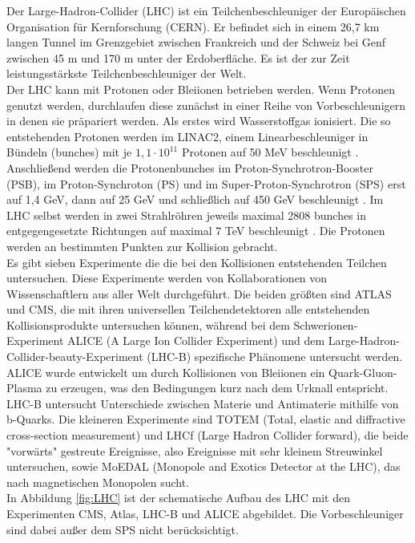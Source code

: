 Der Large-Hadron-Collider (LHC) ist ein Teilchenbeschleuniger der Europ\"aischen Organisation f\"ur Kernforschung (CERN). Er befindet sich in einem 26,7 km langen Tunnel im Grenzgebiet zwischen Frankreich und der Schweiz bei Genf zwischen 45 m und 170 m unter der Erdoberfl\"ache. Es ist der zur Zeit leistungsst\"arkste Teilchenbeschleuniger der Welt.\\
Der LHC kann mit Protonen oder Bleiionen betrieben werden. Wenn Protonen genutzt werden, durchlaufen diese zun\"achst in einer Reihe von Vorbeschleunigern in denen sie pr\"apariert werden. Als erstes wird Wasserstoffgas ionisiert. Die so entstehenden Protonen werden im LINAC2, einem Linearbeschleuniger in B\"undeln (bunches) mit je $1,1\cdot 10^{11}$ Protonen auf 50 MeV beschleunigt \cite{O'Luanaigh:1997427}. Anschlie\ss end werden die Protonenbunches im Proton-Synchrotron-Booster (PSB), im Proton-Synchroton (PS) und im Super-Proton-Synchrotron (SPS) erst auf 1,4 GeV, dann auf 25 GeV und schlie\ss lich auf 450 GeV beschleunigt \cite{O'Luanaigh:1997193}. Im LHC selbst werden in zwei Strahlr\"ohren jeweils maximal 2808 bunches in entgegengesetzte Richtungen auf maximal 7 TeV beschleunigt \cite{Lefevre:1165534}. Die Protonen werden an bestimmten Punkten zur Kollision gebracht. \\
Es gibt sieben Experimente die die bei den Kollisionen entstehenden Teilchen untersuchen. Diese Experimente werden von Kollaborationen von Wissenschaftlern aus aller Welt durchgef\"uhrt. Die beiden gr\"o\ss ten sind ATLAS und CMS, die mit ihren universellen Teilchendetektoren alle entstehenden Kollisionsprodukte untersuchen k\"onnen, w\"ahrend bei dem Schwerionen-Experiment ALICE (A Large Ion Collider Experiment) und dem Large-Hadron-Collider-beauty-Experiment (LHC-B) spezifische Ph\"anomene untersucht werden. ALICE wurde entwickelt um durch Kollisionen von Bleiionen ein Quark-Gluon-Plasma zu erzeugen, was den Bedingungen kurz nach dem Urknall entspricht. LHC-B untersucht Unterschiede zwischen Materie und Antimaterie mithilfe von b-Quarks. Die kleineren Experimente sind TOTEM (Total, elastic and diffractive cross-section measurement) und LHCf (Large Hadron Collider forward), die beide "vorw\"arts" gestreute Ereignisse, also Ereignisse mit sehr kleinem Streuwinkel untersuchen, sowie MoEDAL (Monopole and Exotics Detector at the LHC), das nach magnetischen Monopolen sucht. \cite{O'Luanaigh:1997374, O'Luanaigh:1997265, O'Luanaigh:1997262, O'Luanaigh:1997259, O'Luanaigh:1997373, O'Luanaigh:1997527}\\
In Abbildung \ref{fig:LHC} ist der schematische Aufbau des LHC mit den Experimenten CMS, Atlas, LHC-B und ALICE abgebildet. Die Vorbeschleuniger sind dabei au\ss er dem SPS nicht ber\"ucksichtigt.

